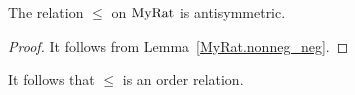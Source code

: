 \begin{lemma}
    \label{MyRat.le_antisymm}
    \leanok
    The relation $\leq$ on $\mathrm{MyRat}$ is antisymmetric.
\end{lemma}
\begin{proof}
    \leanok
    It follows from Lemma~\ref{MyRat.nonneg_neg}.
\end{proof}

It follows that $\leq$ is an order relation.